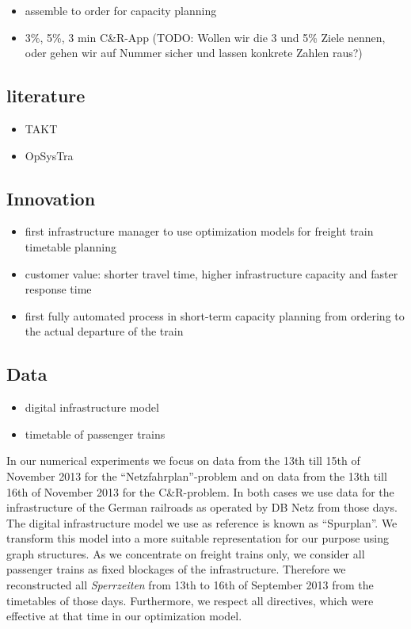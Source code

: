 \begin{itemize}
  \item assemble to order for capacity planning
  \item 3\%, 5\%, 3 min C\&R-App (TODO: Wollen wir die 3 und 5\% Ziele nennen, oder gehen wir auf Nummer sicher und lassen konkrete Zahlen raus?)
\end{itemize}

\subsection{literature}
\begin{itemize}
  \item TAKT
  \item OpSysTra
\end{itemize}

\subsection{Innovation}
\begin{itemize}
  \item first infrastructure manager to use optimization models for freight train timetable planning
  \item customer value: shorter travel time, higher infrastructure capacity and faster response time
  \item first fully automated process in short-term capacity planning from ordering to the actual departure of the train
\end{itemize}

\subsection{Data}
\begin{itemize}
  \item digital infrastructure model
  \item timetable of passenger trains
\end{itemize}
In our numerical experiments we focus on data from the 13th till 15th of November 2013 for the ``Netzfahrplan''-problem and on data from the 13th till 16th of November 2013 for the C\&R-problem. In both cases we use data for the infrastructure of the German railroads as operated by DB Netz from those days. The digital infrastructure model we use as reference is known as ``Spurplan''. We transform this model into a more suitable representation for our purpose using graph structures. As we concentrate on freight trains only, we consider all passenger trains as fixed blockages of the infrastructure. Therefore we reconstructed all \textit{Sperrzeiten} from 13th to 16th of September 2013 from the timetables of those days. Furthermore, we respect all directives, which were effective at that time in our optimization model.

